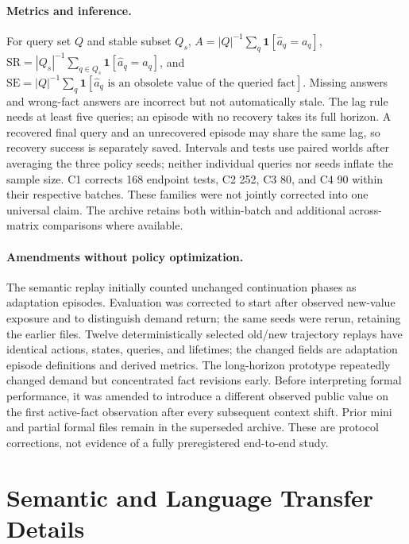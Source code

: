 \paragraph{Metrics and inference.}
For query set $Q$ and stable subset $Q_s$, $A=|Q|^{-1}\sum_q\mathbf1[\hat a_q=a_q]$, $\mathrm{SR}=|Q_s|^{-1}\sum_{q\in Q_s}\mathbf1[\hat a_q=a_q]$, and $\mathrm{SE}=|Q|^{-1}\sum_q\mathbf1[\hat a_q\text{ is an obsolete value of the queried fact}]$. Missing answers and wrong-fact answers are incorrect but not automatically stale. The lag rule needs at least five queries; an episode with no recovery takes its full horizon. A recovered final query and an unrecovered episode may share the same lag, so recovery success is separately saved. Intervals and tests use paired worlds after averaging the three policy seeds; neither individual queries nor seeds inflate the sample size. C1 corrects 168 endpoint tests, C2 252, C3 80, and C4 90 within their respective batches. These families were not jointly corrected into one universal claim. The archive retains both within-batch and additional across-matrix comparisons where available.

\paragraph{Amendments without policy optimization.}
The semantic replay initially counted unchanged continuation phases as adaptation episodes. Evaluation was corrected to start after observed new-value exposure and to distinguish demand return; the same seeds were rerun, retaining the earlier files. Twelve deterministically selected old/new trajectory replays have identical actions, states, queries, and lifetimes; the changed fields are adaptation episode definitions and derived metrics. The long-horizon prototype repeatedly changed demand but concentrated fact revisions early. Before interpreting formal performance, it was amended to introduce a different observed public value on the first active-fact observation after every subsequent context shift. Prior mini and partial formal files remain in the superseded archive. These are protocol corrections, not evidence of a fully preregistered end-to-end study.

\section{Semantic and Language Transfer Details}\label{app:semantic}
